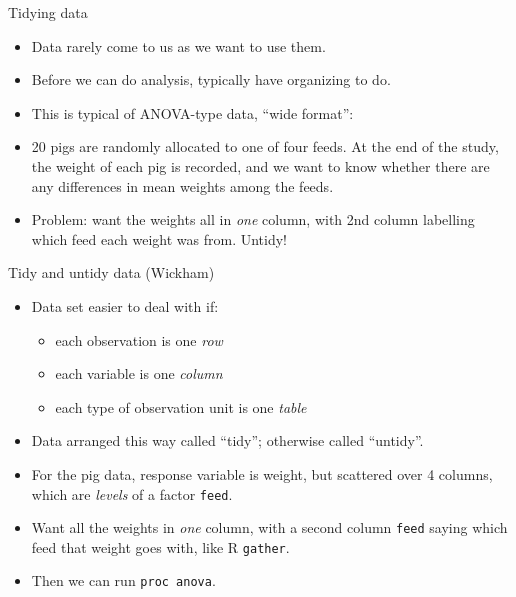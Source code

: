 \documentclass[unknownkeysallowed]{beamer}\usepackage[]{graphicx}\usepackage[]{color}
\begin{document}
\begin{frame}[fragile]{Tidying data}
\begin{itemize}
\item Data rarely come to us as we want to use them.
\item Before we can do analysis, typically have organizing to do.
\item This is typical of ANOVA-type data, ``wide format'':
  
  
\item 20 pigs are randomly allocated to one of four feeds. At the end
  of the study, the weight of each pig is recorded, and we want to
  know whether there are any differences in mean weights among the
  feeds.
\item Problem: want the weights all in \emph{one} column, with 2nd
  column labelling which feed each weight was from. Untidy!
\end{itemize}
\end{frame}

  \begin{frame}[fragile]{Tidy and untidy data (Wickham)}
  
  \begin{itemize}
  \item Data set easier to deal with if:
    \begin{itemize}
    \item each observation is one \emph{row}
    \item each variable is one \emph{column}
    \item each type of observation unit is one \emph{table}
    \end{itemize}

  \item Data arranged this way called ``tidy''; otherwise called
    ``untidy''.
  \item For the pig data, response variable is weight, but scattered
    over 4 columns, which are \emph{levels} of a factor \texttt{feed}.
  \item Want all the weights in \emph{one} column, with a second
    column \texttt{feed} saying which feed that weight goes with, like
    R \texttt{gather}.
  \item Then we can run \texttt{proc anova}.
    
    

    
  \end{itemize}

  

  
\end{frame}
\end{document}
